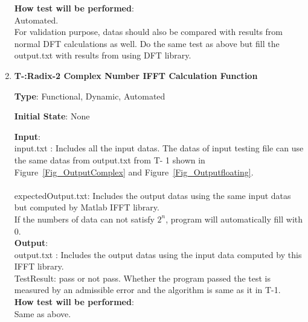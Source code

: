 \documentclass[12pt, titlepage]{article}
\newcounter{tnum}
\begin{document}
\begin{enumerate}
			
\textbf {How test will be performed}: \\
Automated.\\
For validation purpose, datas should also be compared with results from normal DFT calculations as well. Do the same test as above but fill the output.txt with results from using DFT library.

\item{\textbf{T-\thetnum \label{R2CFFT}:Radix-2 Complex Number IFFT Calculation Function}}

\textbf {Type}: Functional, Dynamic, Automated
					
\textbf {Initial State}: None
					
\textbf {Input}:\\{\large input.txt} :  Includes all the input datas. The datas of  input testing file can use the same datas from output.txt from T- 1 shown in Figure~\ref{Fig_OutputComplex} and Figure~\ref{Fig_Outputfloating}. \\ \\
{\large expectedOutput.txt}:  Includes the output datas using the same input datas but computed by Matlab IFFT library.\\ 
If the numbers of data can not satisfy $2^n$, program will automatically fill with 0.\\
					
\textbf {Output}: \\{\large output.txt} : Includes the output datas using the input data computed by this IFFT library.\\
{\large TestResult}: pass or not pass. Whether the program passed the test is measured by an admissible error and the algorithm is same as it in T-1.\\
\textbf {How test will be performed}: \\
Same as above.
\end{enumerate}
\end{document}
